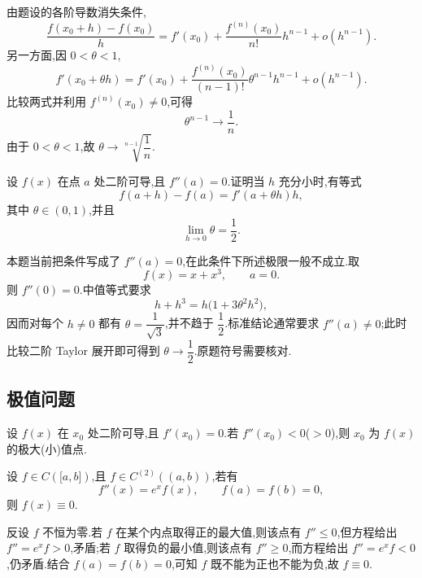 \begin{solution}
    由题设的各阶导数消失条件,
    \[
        \dfrac{f(x_0+h)-f(x_0)}{h}
        =f'(x_0)+\dfrac{f^{(n)}(x_0)}{n!}h^{n-1}+o(h^{n-1}).
    \]
    另一方面,因 $0<\theta<1$,
    \[
        f'(x_0+\theta h)
        =f'(x_0)+\dfrac{f^{(n)}(x_0)}{(n-1)!}
        \theta^{n-1}h^{n-1}+o(h^{n-1}).
    \]
    比较两式并利用 $f^{(n)}(x_0)\neq0$,可得
    \[
        \theta^{n-1}\longrightarrow\dfrac{1}{n}.
    \]
    由于 $0<\theta<1$,故 $\theta\to\sqrt[n-1]{\dfrac{1}{n}}$.
\end{solution}

\begin{example}
    设 $f(x)$ 在点 $a$ 处二阶可导,且 $f''(a)=0$.证明当 $h$ 充分小时,有等式
    \[
        f(a+h)-f(a)=f'(a+\theta h)h,
    \]
    其中 $\theta\in(0,1)$,并且
    \[
        \lim\limits_{h\to0}\theta=\dfrac{1}{2}.
    \]
\end{example}
\exampleblank

\begin{solution}
    本题当前把条件写成了 $f''(a)=0$,在此条件下所述极限一般不成立.取
    \[
        f(x)=x+x^3,
        \qquad a=0.
    \]
    则 $f''(0)=0$.中值等式要求
    \[
        h+h^3=h\bigl(1+3\theta^2h^2\bigr),
    \]
    因而对每个 $h\neq0$ 都有 $\theta=\dfrac{1}{\sqrt3}$,并不趋于 $\dfrac{1}{2}$.标准结论通常要求 $f''(a)\neq0$;此时比较二阶 Taylor 展开即可得到 $\theta\to\dfrac{1}{2}$.原题符号需要核对.
\end{solution}



\subsection{极值问题}

设 $f(x)$ 在 $x_0$ 处二阶可导,且 $f'(x_0)=0$.若 $f''(x_0)<0$($>0$),则 $x_0$ 为 $f(x)$ 的极大(小)值点.

\begin{example}
    设 $f\in C(\lbrack a,b\rbrack)$,且 $f\in C^{(2)}((a,b))$,若有
    \[
        f''(x)=e^x f(x),\qquad f(a)=f(b)=0,
    \]
    则 $f(x)\equiv0$.
\end{example}
\exampleblank

\begin{solution}
    反设 $f$ 不恒为零.若 $f$ 在某个内点取得正的最大值,则该点有 $f''\leq0$,但方程给出 $f''=e^x f>0$,矛盾;若 $f$ 取得负的最小值,则该点有 $f''\geq0$,而方程给出 $f''=e^x f<0$,仍矛盾.结合 $f(a)=f(b)=0$,可知 $f$ 既不能为正也不能为负,故 $f\equiv0$.
\end{solution}

